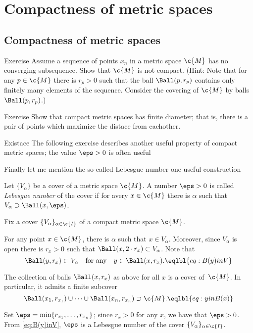 \chapter{Compactness of metric spaces}

\section{Compactness of metric spaces}

\begin{thm}{Exercise}
Assume a sequence of points $x_n$ in a metric space $\c{M}$ has no converging subsequence.
Show that $\c{M}$ is not compact.
(Hint: Note that for any $p\in \c{M}$ there is $r_p>0$ such that the ball $\Ball(p,r_p)$ contains only finitely many elements of the sequence. Consider the covering of $\c{M}$ by balls $\Ball(p,r_p)$.)
\end{thm}


\begin{thm}{Exercise}
Show that compact metric spaces has finite diameter;
that is, there is a pair of points which maximize the distace from eachother.
\end{thm}


Existace 
The following exercise describes another useful property of compact metric spaces;
the value $\eps>0$ is often useful 

Finally let me mention the so-called Lebesgue number one useful construction

Let $\{V_\alpha\}$ be a cover of a metric space $\c{M}$.
A number $\eps > 0$ is called \emph{Lebesgue number} of the cover if for avery $x\in\c{M}$ there is $\alpha$ such that $ V_\alpha\supset \Ball(x,\eps)$.



Fix a cover $\{V_\alpha\}_{\alpha\in\c{I}}$ of a compact metric space $\c{M}$.

For any point $x\in \c{M}$, there is $\alpha$ such that $x\in V_\alpha$.
Moreover, since $V_\alpha$ is open there is $r_x>0$ such that 
$\Ball(x,2\cdot r_x)\subset V_\alpha$.
Note that 
\[\Ball(y,r_x)\subset V_\alpha\quad\text{for any}\quad y\in \Ball(x,r_x).
\eqlbl{eq:B(y)inV}\] 

The collection of balls $\Ball(x,r_x)$ as above for all $x$
is a cover of~$\c{M}$.
In particular, it admits a finite subcover
\[\Ball(x_1,r_{x_1})\cup\dots\cup \Ball(x_n,r_{x_n})\supset \c{M}.\eqlbl{eq:yinB(x)}\]

Set $\eps=\min\{r_{x_1},\dots,r_{x_n}\}$;
since $r_x>0$ for any $x$, we have that $\eps>0$.
From \ref{eq:B(y)inV}, $\eps$ is a Lebesgue number of the cover $\{V_\alpha\}_{\alpha\in\c{I}}$.
\qeds


